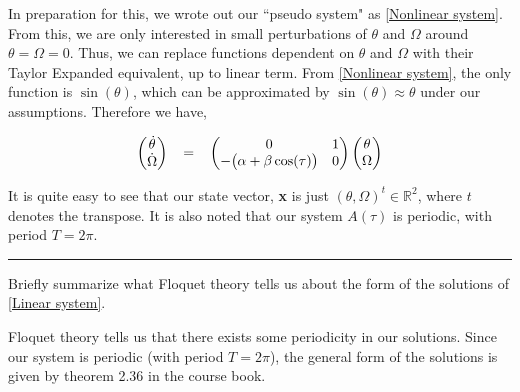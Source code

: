 \documentclass[12pt]{article}
\newcommand{\jump}{\vspace{5mm}}
\newcommand{\R}{\mathbb{R}}
\begin{document}
\begin{enumerate}[]
\begin{solution}
            In preparation for this, we wrote out our ``pseudo system" as \ref{Nonlinear system}. From this, we are only interested in small perturbations of $\theta$ and $\Omega$ around $\theta = \Omega = 0$. Thus, we can replace functions dependent on $\theta$ and $\Omega$ with their Taylor Expanded equivalent, up to linear term. From \ref{Nonlinear system}, the only function is $\sin(\theta)$, which can be approximated by $\sin(\theta) \approx \theta$ under our assumptions. Therefore we have,

            \begin{align}
                \begin{pmatrix}
                    \dot{\theta}    \\
                    \dot{\Omega}
                \end{pmatrix}
                \hspace{3mm}
                =
                \hspace{3mm}
                \begin{pmatrix}
                    0   &1  \\
                    -\big( \alpha + \beta\cos(\tau)\big) &0
                \end{pmatrix}
                \begin{pmatrix}
                    \theta  \\
                    \Omega
                \end{pmatrix}   \label{Linear system}
            \end{align}

            It is quite easy to see that our state vector, \textbf{x} is just $(\theta, \Omega)^t \in \R^2$, where $t$ denotes the transpose. It is also noted that our system $A(\tau)$ is periodic, with period $T = 2\pi$.
        \end{solution}

        \jump
        \hrule
        
        \jump
        Briefly summarize what Floquet theory tells us about the form of the solutions of \ref{Linear system}.

        \begin{solution}
        
            Floquet theory tells us that there exists some periodicity in our solutions. Since our system is periodic (with period $T = 2\pi$), the general form of the solutions is given by theorem 2.36 in the course book.


\end{solution}
\end{enumerate}
\end{document}
